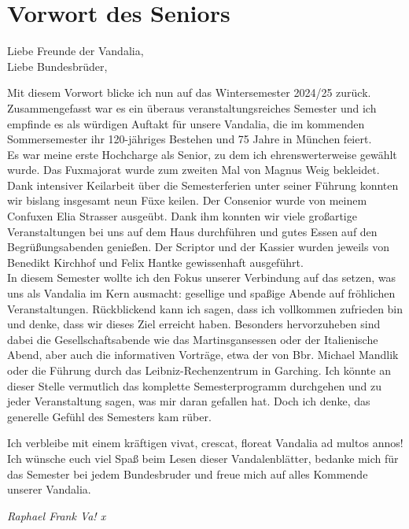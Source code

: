 \section{Vorwort des Seniors}

Liebe Freunde der Vandalia,\\
Liebe Bundesbrüder,
\begin{multicols}{2}

Mit diesem Vorwort blicke ich nun auf das Wintersemester 2024/25 zurück. Zusammengefasst
war es ein überaus veranstaltungsreiches Semester und ich empfinde es als würdigen Auftakt für unsere
Vandalia, die im kommenden Sommersemester ihr 120-jähriges Bestehen und 75
Jahre in München feiert.\\
Es war meine erste Hochcharge als Senior, zu dem ich ehrenswerterweise
gewählt wurde. Das Fuxmajorat wurde zum zweiten Mal von Magnus Weig bekleidet.
Dank intensiver Keilarbeit über die Semesterferien unter seiner Führung konnten
wir bislang insgesamt neun Füxe keilen. Der Consenior wurde von meinem Confuxen
Elia Strasser ausgeübt. Dank ihm konnten wir viele großartige Veranstaltungen
bei uns auf dem Haus durchführen und gutes Essen auf den Begrüßungsabenden
genießen. Der Scriptor und der Kassier wurden jeweils von Benedikt Kirchhof und
Felix Hantke gewissenhaft ausgeführt.\\
In diesem
Semester wollte ich den Fokus unserer Verbindung auf das setzen, was uns als
Vandalia im Kern ausmacht: gesellige und spaßige Abende auf fröhlichen
Veranstaltungen. Rückblickend kann ich sagen, dass ich vollkommen zufrieden bin
und denke, dass wir dieses Ziel erreicht haben. Besonders hervorzuheben sind
dabei die Gesellschaftsabende wie das Martinsgansessen oder der Italienische
Abend, aber auch die informativen Vorträge, etwa der von Bbr. Michael Mandlik
oder die Führung durch das Leibniz-Rechenzentrum in Garching. Ich könnte an
dieser Stelle vermutlich das komplette Semesterprogramm durchgehen und zu jeder
Veranstaltung sagen, was mir daran gefallen hat. Doch ich denke, das generelle
Gefühl des Semesters kam rüber.

Ich verbleibe mit einem kräftigen vivat, crescat, floreat Vandalia ad
multos annos! Ich wünsche euch viel Spaß beim Lesen dieser
Vandalenblätter, bedanke mich für das Semester bei jedem Bundesbruder und freue
mich auf alles Kommende unserer Vandalia.

	\begin{flushright}
		\hfill\emph{Raphael Frank Va! x}
	\end{flushright}
\end{multicols}

